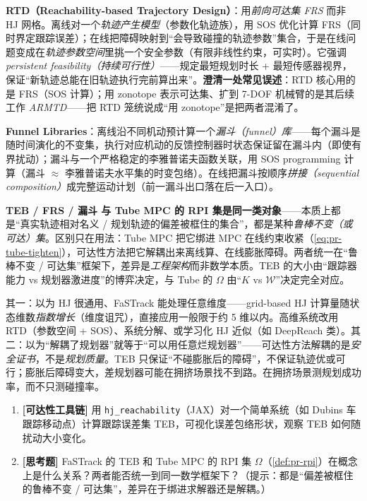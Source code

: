 \textbf{RTD（Reachability-based Trajectory Design）}\cite{kousik2020rtd}：用\emph{前向可达集 FRS} 而非 HJ 网格。离线对一个\emph{轨迹产生模型}（参数化轨迹族），用 SOS 优化计算 FRS（同时界定跟踪误差）；在线把障碍映射到“会导致碰撞的轨迹参数”集合，于是在线问题变成在\emph{轨迹参数空间}里挑一个安全参数（有限非线性约束，可实时）。它强调 \emph{persistent feasibility（持续可行性）}——规定最短规划时长 + 最短传感器视界，保证“新轨迹总能在旧轨迹执行完前算出来”。\textbf{澄清一处常见误述}：RTD 核心用的是 FRS（SOS 计算）；用 zonotope 表示可达集、扩到 7-DOF 机械臂的是其后续工作 \emph{ARMTD}——把 RTD 笼统说成“用 zonotope”是把两者混淆了。

\textbf{Funnel Libraries}\cite{majumdar2017funnel}：离线沿不同机动预计算一个\emph{漏斗（funnel）库}——每个漏斗是随时间演化的不变集，执行对应机动的反馈控制器时状态保证留在漏斗内（即使有界扰动）；漏斗与一个严格稳定的李雅普诺夫函数关联，用 SOS programming 计算（漏斗 $\approx$ 李雅普诺夫水平集的时变包络）。在线把漏斗按顺序\emph{拼接（sequential composition）}成完整运动计划（前一漏斗出口落在后一入口）。

\begin{insight}
\textbf{TEB / FRS / 漏斗 与 Tube MPC 的 RPI 集是同一类对象}——本质上都是“真实轨迹相对名义 / 规划轨迹的偏差被框住的集合”，都是某种\emph{鲁棒不变（或可达）集}。区别只在用法：Tube MPC 把它绑进 MPC 在线约束收紧（\cref{eq:pr-tube-tighten}），可达性方法把它解耦出来离线算、在线膨胀障碍。两者统一在“鲁棒不变 / 可达集”框架下，差异是\emph{工程架构}而非数学本质。TEB 的大小由“跟踪器能力 vs 规划器激进度”的博弈决定，与 Tube 的 $\Omega$ 由“$K$ vs $\mathcal{W}$”决定完全对应。
\end{insight}

\begin{pitfall}
其一：以为 HJ 很通用、FaSTrack 能处理任意维度——grid-based HJ 计算量随状态维数\emph{指数增长}（维度诅咒），直接应用一般限于约 5 维以内。高维系统改用 RTD（参数空间 + SOS）、系统分解、或学习化 HJ 近似（如 DeepReach 类）。其二：以为“解耦了规划器”就等于“可以用任意烂规划器”——可达性方法解耦的是\emph{安全证书}，不是\emph{规划质量}。TEB 只保证“不碰膨胀后的障碍”，不保证轨迹优或可行；膨胀后障碍变大，差规划器可能在拥挤场景找不到路。在拥挤场景测规划成功率，而不只测碰撞率。
\end{pitfall}

\begin{practice}
\begin{enumerate}
  \item \textbf{[可达性工具链]} 用 \texttt{hj\_reachability}（JAX）对一个简单系统（如 Dubins 车跟踪移动点）计算跟踪误差集 TEB，可视化误差包络形状，观察 TEB 如何随扰动大小变化。
  \item \textbf{[思考题]} FaSTrack 的 TEB 和 Tube MPC 的 RPI 集 $\Omega$（\cref{def:pr-rpi}）在概念上是什么关系？两者能否统一到同一数学框架下？（提示：都是“偏差被框住的鲁棒不变 / 可达集”，差异在于绑进求解器还是解耦。）
\end{enumerate}
\end{practice}

